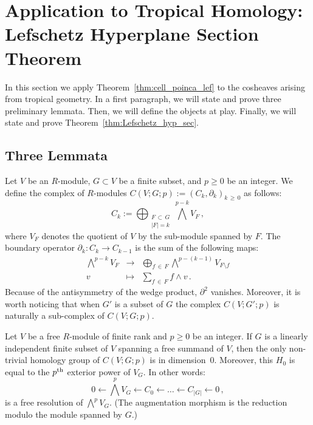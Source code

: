 \documentclass[AHL,Unicode,longabstracts,published]{cedram}
\begin{document}
\section{Application to Tropical Homology: Lefschetz Hyperplane Section Theorem}

In this section we apply Theorem~\ref{thm:cell_poinca_lef} to the cosheaves arising from tropical geometry. In a first paragraph, we will state and prove three preliminary lemmata. Then, we will define the objects at play. Finally, we will state and prove Theorem~\ref{thm:Lefschetz_hyp_sec}.

\subsection{Three Lemmata}

\begin{defi}\label{definition:resolution_ext_alg}
Let $V$ be an $R$-module, $G\subset V$ be a finite subset, and $p\geq 0$ be an integer. We define the complex of $R$-modules $C(V;G;p):= (C_k,\partial_k)_{k\,\geq\,0}$ as follows:
\begin{equation*}
C_k:= \bigoplus_{\substack{F\,\subset\,G \\
|F|=k}} \bigwedge^{p-k} V_F\,,
\end{equation*}
where $V_F$ denotes the quotient of $V$ by the sub-module spanned by $F$. The boundary operator $\partial_k:C_k\rightarrow C_{k-1} $ is the sum of the following maps:
\begin{equation*}
\begin{array}{rcl}
\displaystyle \bigwedge^{p-k} V_{F} & \longrightarrow & \displaystyle\bigoplus_{f\,\in\,F}\bigwedge^{p-(k-1)} V_{F\setminus f} \\
v &\longmapsto & \displaystyle \sum_{f\,\in\,F} f\wedge v\,.
\end{array}
\end{equation*}
Because of the antisymmetry of the wedge product, $\partial^2$ vanishes. Moreover, it is worth noticing that when $G'$ is a subset of $G$ the complex $C(V;G';p)$ is naturally a sub-complex of $C(V;G;p)$.
\end{defi}

\begin{lemm}\label{lemm:resolution_ext_alg}
Let $V$ be a free $R$-module of finite rank and $p\geq 0$ be an integer. If $G$ is a linearly independent finite subset of $V$ spanning a free summand of $V$, then the only non-trivial homology group of $C(V;G;p)$ is in dimension~0. Moreover, this $H_0$ is equal to the $p^{\rm th}$ exterior power of $V_G$. In other words:
\begin{equation*}
0\leftarrow \bigwedge^{p}V_G \leftarrow C_0 \leftarrow\dots \leftarrow C_{|G|}\leftarrow 0\,,
\end{equation*}
is a free resolution of $\bigwedge^{p}V_G$. (The augmentation morphism is the reduction modulo the module spanned by $G$.)
\end{lemm}
\end{document}
